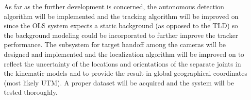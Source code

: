 As far as the further development is concerned, the autonomous detection algorithm will be implemented and the tracking algorithm will be improved on since the OLS system expects a static background (as opposed to the TLD) so the background modeling could be incorporated to further improve the tracker performance. The subsystem for target handoff among the cameras will be designed and implemented and the localization algorithm will be improved on to reflect the uncertainty of the locations and orientations of the separate joints in the kinematic models and to provide the result in global geographical coordinates (most likely UTM). A proper dataset will be acquired and the system will be tested thoroughly.

\vata[5]